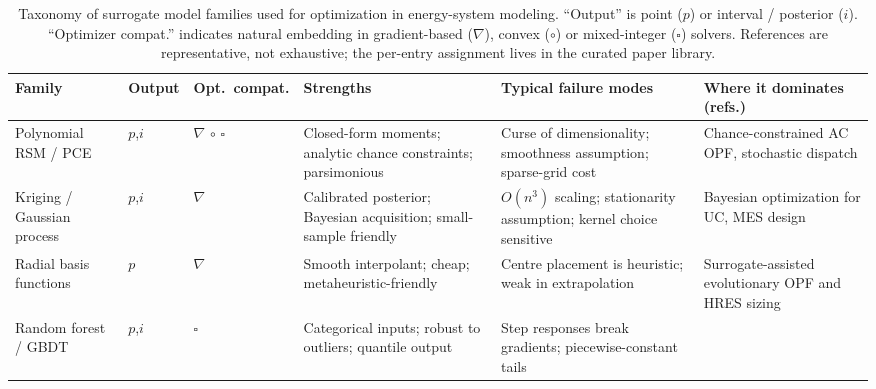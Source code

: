 
\begin{table}[!t]
  \centering
  \footnotesize
  \caption{Taxonomy of surrogate model families used for optimization in
  energy-system modeling. ``Output'' is point ($p$) or interval / posterior
  ($i$). ``Optimizer compat.'' indicates natural embedding in
  gradient-based ($\nabla$), convex ($\circ$) or mixed-integer
  ($\square$) solvers. References are representative, not exhaustive;
  the per-entry assignment lives in the curated paper library.}
  \label{tab:T1-taxonomy}
  \renewcommand{\arraystretch}{1.2}
  \begin{tabularx}{\textwidth}{@{}L{0.16\textwidth} C{0.05\textwidth} C{0.08\textwidth} L{0.21\textwidth} L{0.20\textwidth} L{0.22\textwidth}@{}}
    \toprule
    Family & Output & Opt.\ compat. & Strengths & Typical failure modes & Where it dominates (refs.) \\
    \midrule
    Polynomial RSM / PCE
      & $p$,$i$ & $\nabla$ $\circ$ $\square$
      & Closed-form moments; analytic chance constraints; parsimonious
      & Curse of dimensionality; smoothness assumption; sparse-grid cost
      & Chance-constrained AC OPF, stochastic dispatch
        \cite{Muhlpfordt20194806,Muhlpfordt20174490,Koirala20242284,Xu20212696,Engelmann20186188} \\
    Kriging / Gaussian process
      & $p$,$i$ & $\nabla$
      & Calibrated posterior; Bayesian acquisition; small-sample friendly
      & $O(n^3)$ scaling; stationarity assumption; kernel choice sensitive
      & Bayesian optimization for UC, MES design
        \cite{Hu2020,Hu2021671,Volodina2022,Schulte2020,Roth2019214,Liu20222679} \\
    Radial basis functions
      & $p$    & $\nabla$
      & Smooth interpolant; cheap; metaheuristic-friendly
      & Centre placement is heuristic; weak in extrapolation
      & Surrogate-assisted evolutionary OPF and HRES sizing
        \cite{Liu20223726,Mahapatra2022721,Mahapatra20161921,Hussien20211883} \\
    Random forest / GBDT
      & $p$,$i$ & $\square$
      & Categorical inputs; robust to outliers; quantile output
      & Step responses break gradients; piecewise-constant tails

\end{tabularx}
\end{table}
